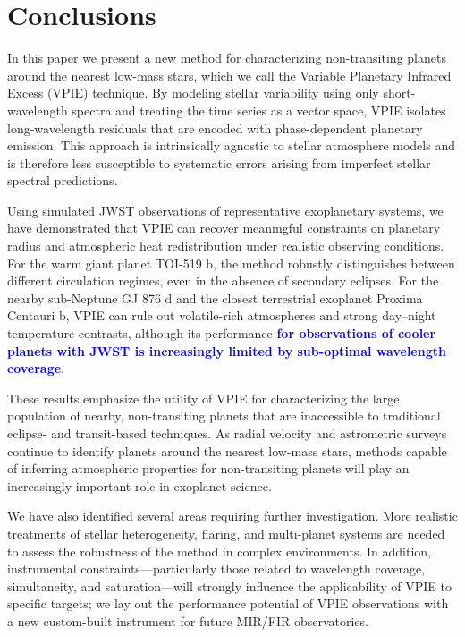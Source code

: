 \documentclass[twocolumn,linenumbers]{aastex7}
\newcommand{\update}[1]{\textcolor{blue}{\bf #1}}
\begin{document}
\section{Conclusions}\label{sec:conclusion}
In this paper we present a new method for characterizing non-transiting planets around the nearest low-mass stars, which we call the Variable Planetary Infrared Excess (VPIE) technique. By modeling stellar variability using only short-wavelength spectra and treating the time series as a vector space, VPIE isolates long-wavelength residuals that are encoded with phase-dependent planetary emission. This approach is intrinsically agnostic to stellar atmosphere models and is therefore less susceptible to systematic errors arising from imperfect stellar spectral predictions.

Using simulated JWST observations of representative exoplanetary systems, we have demonstrated that VPIE can recover meaningful constraints on planetary radius and atmospheric heat redistribution under realistic observing conditions. For the warm giant planet TOI-519 b, the method robustly distinguishes between different circulation regimes, even in the absence of secondary eclipses. For the nearby sub-Neptune GJ 876 d and the closest terrestrial exoplanet Proxima Centauri b, VPIE can rule out volatile-rich atmospheres and strong day–night temperature contrasts, although its performance \update{for observations of cooler planets with JWST is increasingly limited by sub-optimal wavelength coverage}.

These results emphasize the utility of VPIE for characterizing the large population of nearby, non-transiting planets that are inaccessible to traditional eclipse- and transit-based techniques. As radial velocity and astrometric surveys continue to identify planets around the nearest low-mass stars, methods capable of inferring atmospheric properties for non-transiting planets will play an increasingly important role in exoplanet science.

We have also identified several areas requiring further investigation. More realistic treatments of stellar heterogeneity, flaring, and multi-planet systems are needed to assess the robustness of the method in complex environments. In addition, instrumental constraints—particularly those related to wavelength coverage, simultaneity, and saturation—will strongly influence the applicability of VPIE to specific targets; we lay out the performance potential of VPIE observations with a new custom-built instrument for future MIR/FIR observatories.
\end{document}
